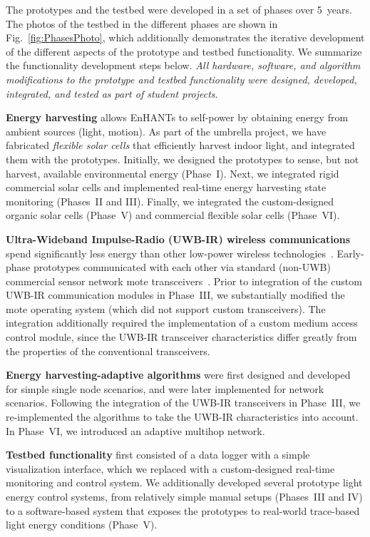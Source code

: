 \documentclass[journal,twopages]{IEEEtran}
\newenvironment{myitemize}{\begin{list}{}{\renewcommand{\leftmargin}{0.2in}}}{\end{list}}
\begin{document}
The prototypes and the testbed were developed in a set of phases over 5~years. The photos of the testbed in the different phases are shown in Fig.~\ref{fig:PhasesPhoto}, which additionally demonstrates the iterative development of the different aspects of the prototype and testbed functionality. We summarize the functionality development steps below. \emph{All hardware, software, and algorithm modifications to the prototype and testbed functionality
were designed, developed, integrated, and tested as part of student projects}. \begin{myitemize}
\item \textbf{Energy harvesting} allows EnHANTs to self-power by obtaining energy from ambient sources (light, motion).
    As part of the umbrella project, we have fabricated \emph{flexible solar cells} that
    efficiently harvest indoor light, and integrated them with the prototypes.
    Initially, we designed the prototypes to sense, but not harvest, available environmental energy (Phase~I).
    Next, we integrated rigid commercial solar cells and implemented real-time energy harvesting state monitoring (Phases~II and III). Finally, we integrated the custom-designed organic solar cells (Phase~V) and commercial flexible solar cells (Phase~VI). \item \textbf{Ultra-Wideband \mbox{Impulse-Radio} (\mbox{UWB-IR}) wireless communications}
    spend significantly less energy than other low-power wireless technologies~\cite{Crepaldi2011}.
    Early-phase prototypes communicated with each other via standard (\mbox{non-UWB}) commercial sensor network mote transceivers~\cite{MicaMote}. Prior to integration of the custom \mbox{UWB-IR} communication modules
    in Phase~III, we substantially modified the mote operating system (which did not support custom transceivers).
    The integration additionally required the implementation of a custom medium access control module, since the \mbox{UWB-IR} transceiver characteristics differ greatly from the properties of the conventional transceivers. \item \textbf{Energy harvesting-adaptive algorithms} were first designed and developed for simple single node scenarios, and were later implemented for network scenarios.
    Following the integration of the \mbox{UWB-IR} transceivers in Phase~III, we
     re-implemented the algorithms to take the \mbox{UWB-IR}
     characteristics into account. In Phase~VI, we introduced an adaptive multihop network.
\item \textbf{Testbed functionality} first consisted of a data logger with a simple visualization interface, which we  replaced with a custom-designed real-time monitoring and control system. We additionally developed several prototype light energy control systems,
    from relatively simple manual setups (Phases~III and IV) to a software-based system that exposes the prototypes to real-world trace-based light energy conditions (Phase~V).
\end{myitemize}
\end{document}
